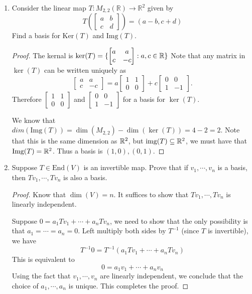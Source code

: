 \documentclass{amsart}
\begin{document}
\begin{enumerate}
\begin{proof}
		\end{proof}
		\item Consider the linear map $T:M_{2,2}(\mathbb{R})\to \mathbb{R}^2$ given by
		\[T\left(\begin{bmatrix}
			a&b\\c&d
		\end{bmatrix}\right)=(a-b,c+d)\] 
		Find a basis for $\text{Ker}(T)$ and $\text{Img}(T)$.
		\begin{proof}
			The kernal is $\ker(T)=\{\begin{bmatrix}
			a&a\\c&-c
		\end{bmatrix}: a,c\in \mathbb{R}\}$ Note that any matrix in $\ker(T)$ can be written uniquely as 
		\[\begin{bmatrix}
			a&a\\c&-c
		\end{bmatrix}=a\begin{bmatrix}
			1&1\\0&0
		\end{bmatrix}+c\begin{bmatrix}
			0&0\\1&-1
		\end{bmatrix}.\]
		Therefore $\begin{bmatrix}
			1&1\\0&0
		\end{bmatrix}$ and $\begin{bmatrix}
			0&0\\1&-1
		\end{bmatrix}$ for a basis for $\ker(T)$.
		
		We know that $dim(\text{Img}(T))=\dim(M_{2,2})-\dim(\ker(T))=4-2=2$. Note that this is the same dimension as $\mathbb{R}^2$, but $\text{img}(T)\subseteq \mathbb{R}^2$, we must have that $\text{Img}(T)=\mathbb{R}^2$. Thus a basis is $(1,0),(0,1)$.
		\end{proof}
		\item Suppose $T\in \text{End}(V)$ is an invertible map. Prove that if $v_1,\cdots,v_n$ is a basis, then $Tv_1,\cdots,Tv_n$ is also a basis.
		
	\begin{proof}
		Know that $\dim(V)=n$. It suffices to show that $Tv_1,\cdots,Tv_n$ is linearly independent.
		
		Suppose $0=a_1Tv_1+\cdots+a_nTv_n$, we need to show that the only possibility is that $a_1=\cdots=a_n=0$. Left multiply both sides by $T^{-1}$ (since $T$ is invertible), we have
		\[T^{-1}0=T^{-1}(a_1Tv_1+\cdots+a_nTv_n)\]
		This is equivalent to
		\[0=a_1v_1+\cdots+a_n v_n\]
		Using the fact that $v_1,\cdots,v_n$ are linearly independent, we conclude that the choice of $a_1,\cdots,a_n$ is unique. This completes the proof.
		

\end{proof}
\end{enumerate}
\end{document}
